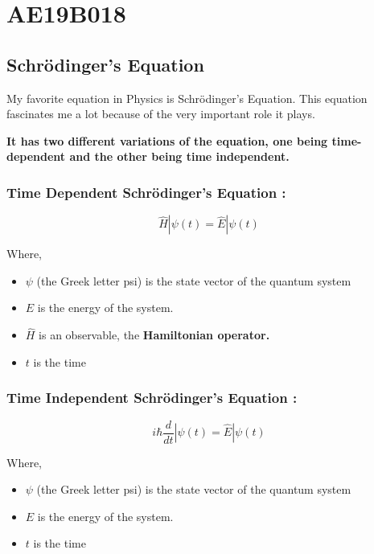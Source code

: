 \section{AE19B018}
\subsection{Schr\"{o}dinger's Equation}
{
My favorite equation in Physics is Schr\"{o}dinger's Equation. This equation fascinates me a lot because of the very important role it plays. 

\textbf{It has two different variations of the equation, one being time-dependent and the other being time independent.}
    
\subsubsection{Time Dependent Schr\"{o}dinger's Equation :}
    \vspace{5mm}
    \begin{equation}
       \hat{H} | \psi(t) = \hat{E} | \psi(t) 
    \end{equation}

Where,
\begin{itemize}
    \item $\psi$ (the Greek letter psi) is the state vector of the quantum system
    \item $E$ is the energy of the system.
    \item $\hat{H}$ is an observable, the \textbf{Hamiltonian operator.}
    \item $t$ is the time
\end{itemize}

\subsubsection{Time Independent Schr\"{o}dinger's Equation :}
\vspace{5mm}
\begin{equation}
       i\hbar\frac{d}{dt}|\psi(t) = \hat{E} | \psi(t)
    \end{equation}

Where,
\begin{itemize}
    \item $\psi$ (the Greek letter psi) is the state vector of the quantum system
    \item $E$ is the energy of the system.
    \item $t$ is the time
\end{itemize}

}
